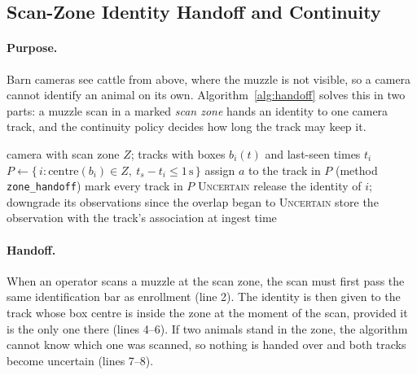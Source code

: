 \documentclass[11pt,letterpaper]{article}
\begin{document}
\subsection{Scan-Zone Identity Handoff and Continuity}

\paragraph{Purpose.} Barn cameras see cattle from above, where the muzzle is not visible, so a camera cannot identify an animal on its own. Algorithm~\ref{alg:handoff} solves this in two parts: a muzzle scan in a marked \emph{scan zone} hands an identity to one camera track, and the continuity policy decides how long the track may keep it.

\begin{algorithm}[H]
\caption{Scan-zone identity handoff and continuity (\texttt{handoff\_v2})}
\label{alg:handoff}
\begin{algorithmic}[1]
\Require camera with scan zone $Z$; tracks with boxes $b_i(t)$ and last-seen times $t_i$
   \State \Return \EndIf
  \State $P \gets \{\, i : \mathrm{centre}(b_i) \in Z,\ t_s - t_i \le 1\,\text{s} \,\}$
   \State assign $a$ to the track in $P$ (method \texttt{zone\_handoff})
   \State mark every track in $P$ \textsc{Uncertain} 
  \EndIf
\EndProcedure
{}
    \State release the identity of $i$; downgrade its observations since the overlap began to \textsc{Uncertain}
  \EndIf
  \State store the observation with the track's association at ingest time
\EndProcedure
\end{algorithmic}
\end{algorithm}

\paragraph{Handoff.} When an operator scans a muzzle at the scan zone, the scan must first pass the same identification bar as enrollment (line 2). The identity is then given to the track whose box centre is inside the zone at the moment of the scan, provided it is the only one there (lines 4--6). If two animals stand in the zone, the algorithm cannot know which one was scanned, so nothing is handed over and both tracks become uncertain (lines 7--8).
\end{document}
